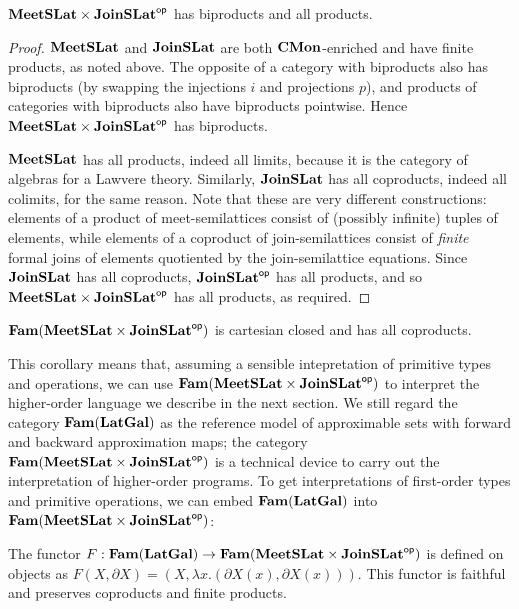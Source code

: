 \begin{proposition}
  $\mathbf{MeetSLat} \times \mathbf{JoinSLat}^{\mathsf{op}}$ has biproducts and all products.
\end{proposition}

\begin{proof}
  $\mathbf{MeetSLat}$ and $\mathbf{JoinSLat}$ are both $\mathbf{CMon}$-enriched and have
  finite products, as noted above. The opposite of a category with
  biproducts also has biproducts (by swapping the injections $i$ and
  projections $p$), and products of categories with biproducts also
  have biproducts pointwise. Hence $\mathbf{MeetSLat} \times \mathbf{JoinSLat}^{\mathsf{op}}$
  has biproducts.

  $\mathbf{MeetSLat}$ has all products, indeed all limits, because it is the
  category of algebras for a Lawvere theory. Similarly, $\mathbf{JoinSLat}$
  has all coproducts, indeed all colimits, for the same reason. Note
  that these are very different constructions: elements of a product
  of meet-semilattices consist of (possibly infinite) tuples of
  elements, while elements of a coproduct of join-semilattices consist
  of \emph{finite} formal joins of elements quotiented by the
  join-semilattice equations. Since $\mathbf{JoinSLat}$ has all coproducts,
  $\mathbf{JoinSLat}^{\mathsf{op}}$ has all products, and so
  $\mathbf{MeetSLat} \times \mathbf{JoinSLat}^{\mathsf{op}}$ has all products, as required.
\end{proof}

\begin{corollary}
  $\mathbf{Fam}(\mathbf{MeetSLat} \times \mathbf{JoinSLat}^{\mathsf{op}})$ is cartesian closed and has
  all coproducts.
\end{corollary}

This corollary means that, assuming a sensible intepretation of
primitive types and operations, we can use
$\mathbf{Fam}(\mathbf{MeetSLat} \times \mathbf{JoinSLat}^{\mathsf{op}})$ to interpret the higher-order
language we describe in the next section. We still regard the category
$\mathbf{Fam}(\mathbf{LatGal})$ as the reference model of approximable sets with
forward and backward approximation maps; the category
$\mathbf{Fam}(\mathbf{MeetSLat} \times \mathbf{JoinSLat}^{\mathsf{op}})$ is a technical device to carry
out the interpretation of higher-order programs. To get
interpretations of first-order types and primitive operations, we can
embed $\mathbf{Fam}(\mathbf{LatGal})$ into $\mathbf{Fam}(\mathbf{MeetSLat} \times \mathbf{JoinSLat}^{\mathsf{op}})$:

\begin{proposition}
  \label{prop:ho-embedding}
  The functor
  $F : \mathbf{Fam}(\mathbf{LatGal}) \to \mathbf{Fam}(\mathbf{MeetSLat} \times \mathbf{JoinSLat}^{\mathsf{op}})$ is defined
  on objects as
  $F(X, \partial X) = (X, \lambda x. (\partial X(x), \partial
  X(x)))$. This functor is faithful and preserves coproducts and
  finite products.
\end{proposition}

